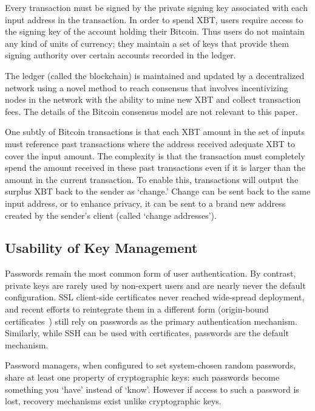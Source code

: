Every transaction must be signed by the private signing key associated with each input address in the transaction. In order to spend XBT, users require access to the signing key of the account holding their Bitcoin. Thus users do not maintain any kind of units of currency; they maintain a set of keys that provide them signing authority over certain accounts recorded in the ledger. 

The ledger (called the blockchain) is maintained and updated by a decentralized network using a novel method to reach consensus that involves incentivizing nodes in the network with the ability to mine new XBT and collect transaction fees. The details of the Bitcoin consensus model are not relevant to this paper.

One subtly of Bitcoin transactions is that each XBT amount in the set of inputs must reference past transactions where the address received adequate XBT to cover the input amount. The complexity is that the transaction must completely spend the amount received in these past transactions even if it is larger than the amount in the current transaction. To enable this, transactions will output the surplus XBT back to the sender as `change.' Change can be sent back to the same input address, or to enhance privacy, it can be sent to a brand new address created by the sender's client (called `change addresses'). 

\subsection{Usability of Key Management}

Passwords remain the most common form of user authentication. By contrast, private keys are rarely used by non-expert users and are nearly never the default configuration. SSL client-side certificates never reached wide-spread deployment, and recent efforts to reintegrate them in a different form (\eg origin-bound certificates~\cite{DCBW12}) still rely on passwords as the primary authentication mechanism. Similarly, while SSH can be used with certificates, passwords are the default mechanism.

Password managers, when configured to set system-chosen random passwords, share at least one property of cryptographic keys: such passwords become something you `have' instead of `know'. However if access to such a password is lost, recovery mechanisms exist unlike cryptographic keys.

